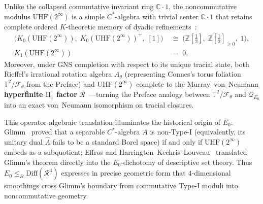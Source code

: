 Unlike the collapsed commutative invariant ring $\mathbb{C}\cdot 1$, the noncommutative modulus $\mathrm{UHF}(2^\infty)$ is a simple $C^*$-algebra with trivial center $\mathbb{C}\cdot 1$ that retains complete ordered $K$-theoretic memory of dyadic refinements~\cite[Ch.~II]{Connes94}:
\[
  \begin{aligned}
    \bigl(K_0(\mathrm{UHF}(2^\infty)),\; K_0(\mathrm{UHF}(2^\infty))^+,\; [1]\bigr) &\;\cong\; \bigl(\mathbb{Z}[\tfrac{1}{2}],\; \mathbb{Z}[\tfrac{1}{2}]_{\ge 0},\; 1\bigr), \\
    K_1(\mathrm{UHF}(2^\infty)) &\;=\; 0.
  \end{aligned}
\]
Moreover, under GNS completion with respect to its unique tracial state, both Rieffel's irrational rotation algebra $A_\theta$ (representing Connes's torus foliation $\mathbb{T}^2/\mathcal{F}_\theta$ from the Preface) and $\mathrm{UHF}(2^\infty)$ complete to the Murray--von~Neumann \textbf{hyperfinite $\mathrm{II}_1$ factor} $\mathcal{R}$~\cite[Ch.~V]{Connes94}---turning the Preface analogy between $\mathbb{T}^2/\mathcal{F}_\theta$ and $\mathcal{Q}_{E_0}$ into an exact von~Neumann isomorphism on tracial closures.

This operator-algebraic translation illuminates the historical origin of $E_0$: Glimm~\cite[Theorem~1, \S 9]{Glimm61} proved that a separable $C^*$-algebra $A$ is non-Type-I (equivalently, its unitary dual $\widehat{A}$ fails to be a standard Borel space) if and only if $\mathrm{UHF}(2^\infty)$ embeds as a subquotient; Effros and Harrington--Kechris--Louveau~\cite[Theorem~1.1]{HKL90} translated Glimm's theorem directly into the $E_0$-dichotomy of descriptive set theory. Thus $E_0 \le_B \mathrm{Diff}(\mathcal{R}^4)$ expresses in precise geometric form that $4$-dimensional smoothings cross Glimm's boundary from commutative Type-I moduli into noncommutative geometry.

